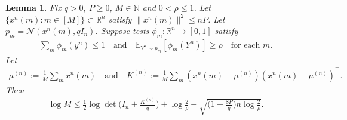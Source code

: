 \documentclass[11pt,onecolumn]{IEEEtran}
\newcommand{\calN}{\mathcal{N}}
\newcommand{\bbE}{\mathbb{E}}
\newcommand{\bbN}{\mathbb{N}}
\newcommand{\bbR}{\mathbb{R}}
\newtheorem{lemma}[theorem]{Lemma}
\begin{document}
\begin{lemma} \label{lem:cov_conv}
Fix $q>0$, $P\ge0$, $M\in\bbN$ and $0<\rho\le 1$. Let $\{x^n(m):m\in [M]\}\subset\bbR^n$ satisfy $\|x^n(m)\|^2\le nP$. Let $p_m =\calN(x^n(m),qI_n)$. Suppose tests $\phi_m:\bbR^n\to[0,1]$ satisfy 
\begin{align}
\sum_m \phi_m(y^n)\le 1\quad\mbox{and}\quad\bbE_{Y^n\sim p_m}[\phi_m(Y^n)]\ge\rho \quad\mbox{for each } m. \label{eqn:subnorm}
\end{align}
Let 
\begin{align}
\mu^{(n)}:=\frac{1}{M}\sum_m x^n(m)\quad\mbox{and}\quad K^{(n)}:=\frac{1}{M}\sum_m (x^n(m)-\mu^{(n)})(x^n(m)-\mu^{(n)})^\top.
\end{align}
Then
\begin{align}
\log M \le\frac{1}{2}\log\det\bigg(I_n+\frac{K^{(n)}}{q} \bigg)+\log\frac{2}{\rho}+\sqrt{ \bigg(1+\frac{8P}{q}\bigg)n\log\frac{2}{\rho}}. \label{eqn:cov_conv}
\end{align}
\end{lemma}
\end{document}
